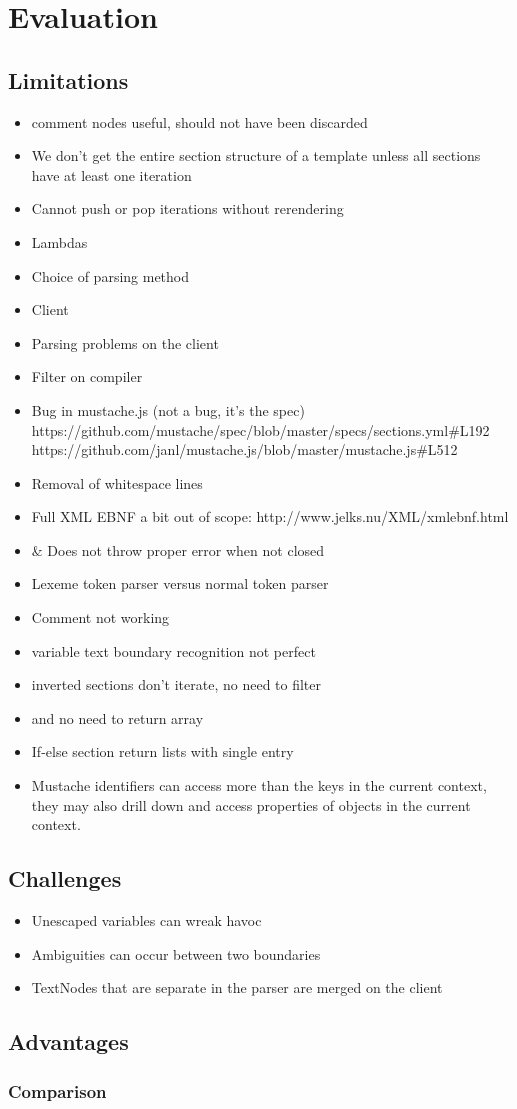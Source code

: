 \chapter{Evaluation}
\label{chap:eval}
\section{Limitations}
\begin{itemize}
\item comment nodes useful, should not have been discarded
\item We don't get the entire section structure of a template unless all
      sections have at least one iteration
\item Cannot push or pop iterations without rerendering
\item Lambdas
\item Choice of parsing method
\item Client
\item Parsing problems on the client
\item Filter on compiler
\item Bug in mustache.js (not a bug, it's the spec)
      https://github.com/mustache/spec/blob/master/specs/sections.yml\#L192
      https://github.com/janl/mustache.js/blob/master/mustache.js\#L512
\item Removal of whitespace lines
\item Full XML EBNF a bit out of scope: http://www.jelks.nu/XML/xmlebnf.html
\item \& Does not throw proper error when not closed
\item Lexeme token parser versus normal token parser
\item Comment not working
\item variable text boundary recognition not perfect
\item inverted sections don't iterate, no need to filter
\item and no need to return array
\item If-else section return lists with single entry
\item Mustache identifiers can access more than the keys in the current context,
      they may also drill down and access properties of objects in the current
      context.
\end{itemize}

\section{Challenges}
\begin{itemize}
\item Unescaped variables can wreak havoc
\item Ambiguities can occur between two boundaries
\item TextNodes that are separate in the parser are merged on the client
\end{itemize}
\section{Advantages}
\subsection{Comparison}
